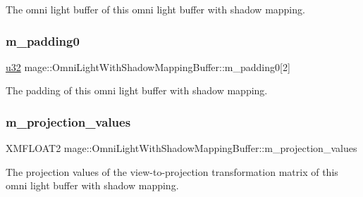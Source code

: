 The omni light buffer of this omni light buffer with shadow mapping. \hypertarget{structmage_1_1_omni_light_with_shadow_mapping_buffer_a789c3cbddfcad2f03e2378ced2db5012}{}\label{structmage_1_1_omni_light_with_shadow_mapping_buffer_a789c3cbddfcad2f03e2378ced2db5012} 
\subsubsection{\texorpdfstring{m\+\_\+padding0}{m\_padding0}}
{\footnotesize\ttfamily \hyperlink{namespacemage_af2b398bf98eb10351f49cad73fe2cc73}{u32} mage\+::\+Omni\+Light\+With\+Shadow\+Mapping\+Buffer\+::m\+\_\+padding0\mbox{[}2\mbox{]}}

The padding of this omni light buffer with shadow mapping. \hypertarget{structmage_1_1_omni_light_with_shadow_mapping_buffer_afd75d76a4713da8430e0c0080602e0b7}{}\label{structmage_1_1_omni_light_with_shadow_mapping_buffer_afd75d76a4713da8430e0c0080602e0b7} 
\subsubsection{\texorpdfstring{m\+\_\+projection\+\_\+values}{m\_projection\_values}}
{\footnotesize\ttfamily X\+M\+F\+L\+O\+A\+T2 mage\+::\+Omni\+Light\+With\+Shadow\+Mapping\+Buffer\+::m\+\_\+projection\+\_\+values}

The projection values of the view-\/to-\/projection transformation matrix of this omni light buffer with shadow mapping. 